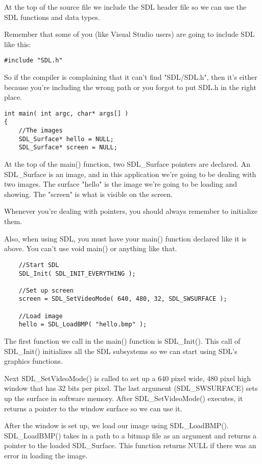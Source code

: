 At the top of the source file we include the SDL header file so we can use the
SDL functions and data types.

Remember that some of you (like Visual Studio users) are going to include SDL
like this:

\begin{verbatim}
#include "SDL.h"
\end{verbatim}

So if the compiler is complaining that it can't find "SDL/SDL.h", then it's
either because you're including the wrong path or you forgot to put SDL.h in the
right place.

\begin{verbatim}
int main( int argc, char* args[] )
{
    //The images
    SDL_Surface* hello = NULL;
    SDL_Surface* screen = NULL;
\end{verbatim}

At the top of the main() function, two SDL\_Surface pointers are declared. An
SDL\_Surface is an image, and in this application we're going to be dealing with
two images. The surface "hello" is the image we're going to be loading and
showing. The "screen" is what is visible on the screen.

Whenever you're dealing with pointers, you should always remember to initialize
them.

Also, when using SDL, you must have your main() function declared like it is
above. You can't use void main() or anything like that.

\begin{verbatim}
    //Start SDL
    SDL_Init( SDL_INIT_EVERYTHING );

    //Set up screen
    screen = SDL_SetVideoMode( 640, 480, 32, SDL_SWSURFACE );

    //Load image
    hello = SDL_LoadBMP( "hello.bmp" );
\end{verbatim}

The first function we call in the main() function is SDL\_Init(). This call of
SDL\_Init() initializes all the SDL subsystems so we can start using SDL's
graphics functions.

Next SDL\_SetVideoMode() is called to set up a 640 pixel wide, 480 pixel high
window that has 32 bits per pixel. The last argument (SDL\_SWSURFACE) sets up
the surface in software memory. After SDL\_SetVideoMode() executes, it returns a
pointer to the window surface so we can use it.

After the window is set up, we load our image using SDL\_LoadBMP().
SDL\_LoadBMP() takes in a path to a bitmap file as an argument and returns a
pointer to the loaded SDL\_Surface. This function returns NULL if there was an
error in loading the image.

